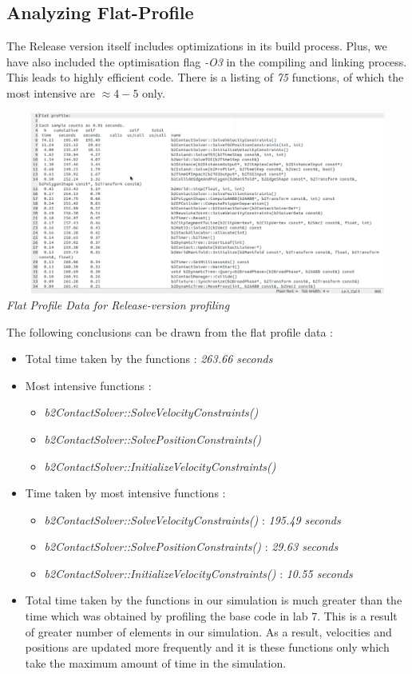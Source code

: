 \documentclass[a4paper,11pt]{article}
\begin{document}
\subsection{Analyzing Flat-Profile}

The Release version itself includes optimizations in its build process. Plus, we have also included the optimisation flag \emph{-O3} in the compiling and linking process. This leads to highly efficient code. There is a listing of \emph{75} functions, of which the most intensive are $\approx 4-5$ only. 

\begin{center}
\includegraphics[width=195mm, height=60mm]{profile_data.eps}\\
\emph{Flat Profile Data for Release-version profiling}
\end{center}

The following conclusions can be drawn from the flat profile data :

\begin{itemize}

\item Total time taken by the functions : \emph{263.66 seconds}
\item Most intensive functions : 
\begin{itemize}
\item \emph{b2ContactSolver::SolveVelocityConstraints()}
\item \emph{b2ContactSolver::SolvePositionConstraints()}
\item \emph{b2ContactSolver::InitializeVelocityConstraints()}
\end{itemize}
\item Time taken by most intensive functions : 
\begin{itemize}
\item \emph{b2ContactSolver::SolveVelocityConstraints()} : \emph{195.49 seconds}
\item \emph{b2ContactSolver::SolvePositionConstraints()} : \emph{29.63 seconds}
\item \emph{b2ContactSolver::InitializeVelocityConstraints()} : \emph{10.55 seconds}
\end{itemize}
\item Total time taken by the functions in our simulation is much greater than the time which was obtained by profiling the base code in lab 7. This is a result of greater number of elements in our simulation. As a result, velocities and positions are updated more frequently and it is these functions only which take the maximum amount of time in the simulation. 
\end{itemize}
\end{document}
